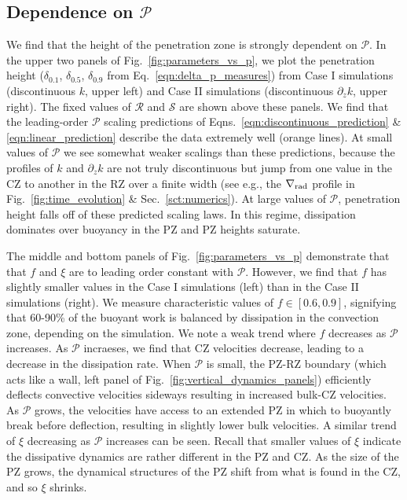 \documentclass[twocolumn]{aastex631}
\newcommand{\gradrad}{\ensuremath{\nabla_{\rm{rad}}}}
\newcommand{\mP}{\ensuremath{\mathcal{P}}}
\newcommand{\mR}{\ensuremath{\mathcal{R}}}
\newcommand{\mS}{\ensuremath{\mathcal{S}}}
\begin{document}
\subsection{Dependence on $\mP$}
We find that the height of the penetration zone is strongly dependent on $\mP$.
In the upper two panels of Fig.~\ref{fig:parameters_vs_p}, we plot the penetration height ($\delta_{0.1}$, $\delta_{0.5}$, $\delta_{0.9}$ from Eq.~\ref{eqn:delta_p_measures}) from Case I simulations (discontinuous $k$, upper left) and Case II simulations (discontinuous $\partial_z k$, upper right).
The fixed values of $\mR$ and $\mS$ are shown above these panels.
We find that the leading-order $\mP$ scaling predictions of Eqns.~\ref{eqn:discontinuous_prediction} \& \ref{eqn:linear_prediction} describe the data extremely well (orange lines).
At small values of $\mP$ we see somewhat weaker scalings than these predictions, because the profiles of $k$ and $\partial_z k$ are not truly discontinuous but jump from one value in the CZ to another in the RZ over a finite width (see e.g., the $\gradrad$ profile in Fig.~\ref{fig:time_evolution} \& Sec.~\ref{sct:numerics}).
At large values of $\mP$, penetration height falls off of these predicted scaling laws.
In this regime, dissipation dominates over buoyancy in the PZ and PZ heights saturate.

The middle and bottom panels of Fig.~\ref{fig:parameters_vs_p} demonstrate that that $f$ and $\xi$ are to leading order constant with $\mP$.
However, we find that $f$ has slightly smaller values in the Case I simulations (left) than in the Case II simulations (right).
We measure characteristic values of $f \in [0.6, 0.9]$, signifying that 60-90\% of the buoyant work is balanced by dissipation in the convection zone, depending on the simulation.
We note a weak trend where $f$ decreases as $\mP$ increases.
As $\mP$ incraeses, we find that CZ velocities decrease, leading to a decrease in the dissipation rate.
When $\mP$ is small, the PZ-RZ boundary (which acts like a wall, left panel of Fig.~\ref{fig:vertical_dynamics_panels}) efficiently deflects convective velocities sideways resulting in increased bulk-CZ velocities.
As $\mP$ grows, the velocities have access to an extended PZ in which to buoyantly break before deflection, resulting in slightly lower bulk velocities.
A similar trend of $\xi$ decreasing as $\mP$ increases can be seen.
Recall that smaller values of $\xi$ indicate the dissipative dynamics are rather different in the PZ and CZ.
As the size of the PZ grows, the dynamical structures of the PZ shift from what is found in the CZ, and so $\xi$ shrinks.
\end{document}
